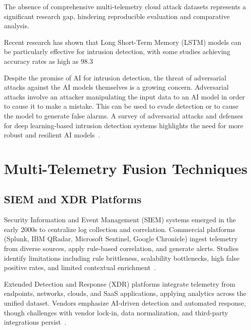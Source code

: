 The absence of comprehensive multi-telemetry cloud attack datasets represents a significant research gap, hindering reproducible evaluation and comparative analysis.

Recent research has shown that Long Short-Term Memory (LSTM) models can be particularly effective for intrusion detection, with some studies achieving accuracy rates as high as 98.3%

Despite the promise of AI for intrusion detection, the threat of adversarial attacks against the AI models themselves is a growing concern. Adversarial attacks involve an attacker manipulating the input data to an AI model in order to cause it to make a mistake. This can be used to evade detection or to cause the model to generate false alarms. A survey of adversarial attacks and defenses for deep learning-based intrusion detection systems highlights the need for more robust and resilient AI models~\cite{ijisae2024adversarial}.

\section{Multi-Telemetry Fusion Techniques}\label{sec:lit-fusion}
\subsection{SIEM and XDR Platforms}
Security Information and Event Management (SIEM) systems emerged in the early 2000s to centralize log collection and correlation. Commercial platforms (Splunk, IBM QRadar, Microsoft Sentinel, Google Chronicle) ingest telemetry from diverse sources, apply rule-based correlation, and generate alerts. Studies identify limitations including rule brittleness, scalability bottlenecks, high false positive rates, and limited contextual enrichment~\cite{axelsson2000fprates,elshoush2011siemsurvey}.

Extended Detection and Response (XDR) platforms integrate telemetry from endpoints, networks, clouds, and SaaS applications, applying analytics across the unified dataset. Vendors emphasize AI-driven detection and automated response, though challenges with vendor lock-in, data normalization, and third-party integrations persist~\cite{gartner2023xdr}.

